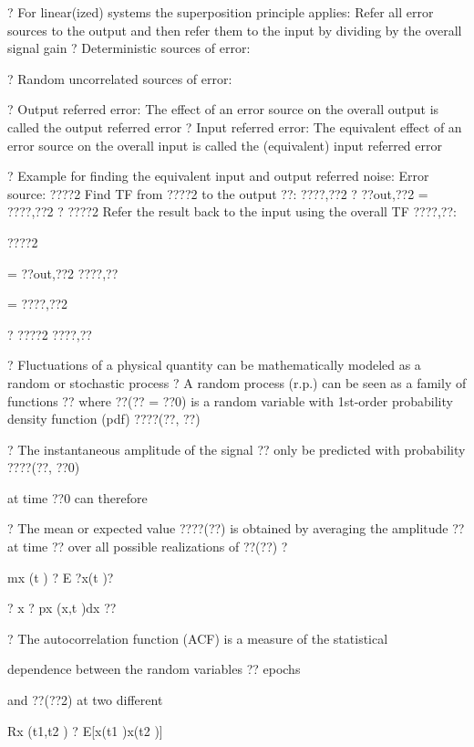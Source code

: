 \documentclass[2pt,landscape]{article}
\begin{document}
\begin{multicols*}{5}
?	For linear(ized) systems the superposition principle applies:
Refer all error sources to the output and then refer them to the input by dividing 
by the overall signal gain
?	Deterministic sources of error:


?	Random uncorrelated sources of error:



?	Output referred error:
The effect of an error source on the overall output is called the output 
referred error
?	Input referred error:
The equivalent effect of an error source on the overall input is called 
the (equivalent) input referred error






?	Example for finding the equivalent input and output referred noise: 
Error source: ????2
Find TF from ????2  to the output ??: ????,??2	? ??out,??2   = ????,??2  ? ????2
Refer the result back to the input using the overall TF ????,??:


????2


= ??out,??2
????,??


= ????,??2


?	????2
????,??



?	Fluctuations of a physical quantity can be mathematically modeled as a
random or stochastic process
?	A random process (r.p.) can be seen as a family of functions ??
where ??(?? = ??0) is a random variable with 1st-order probability density 
function (pdf) ????(??, ??)


?	The instantaneous amplitude of the signal ??
only be predicted with probability ????(??, ??0)


at time ??0 can therefore









?	The mean or expected value ????(??) is obtained by averaging the amplitude ??
at time ?? over all possible realizations of ??(??)
?


mx (t ) ? E ?x(t )?  


? x ? px (x,t )dx
??


?	The autocorrelation function (ACF) is a measure of the statistical


dependence between the random variables ??
epochs


and ??(??2) at two different


Rx (t1,t2 ) ? E[x(t1 )x(t2 )]  



\end{multicols*}
\end{document}
